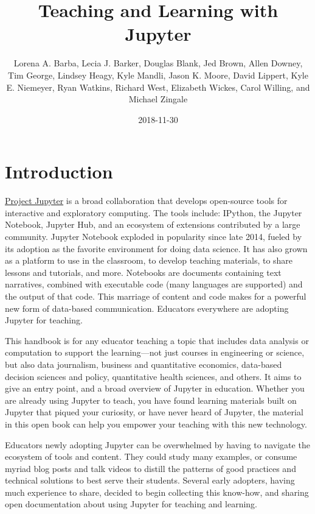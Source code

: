 \documentclass[]{book}
\title{Teaching and Learning with Jupyter}
\author{Lorena A. Barba, Lecia J. Barker, Douglas Blank, Jed Brown, Allen
Downey, Tim George, Lindsey Heagy, Kyle Mandli, Jason K. Moore, David
Lippert, Kyle E. Niemeyer, Ryan Watkins, Richard West, Elizabeth Wickes,
Carol Willing, and Michael Zingale}
\date{2018-11-30}
\begin{document}
\maketitle

{
\setcounter{tocdepth}{1}
\tableofcontents
}
\chapter{Introduction}\label{intro}

\href{http://jupyter.org/}{Project Jupyter} is a broad collaboration
that develops open-source tools for interactive and exploratory
computing. The tools include: IPython, the Jupyter Notebook, Jupyter
Hub, and an ecosystem of extensions contributed by a large community.
Jupyter Notebook exploded in popularity since late 2014, fueled by its
adoption as the favorite environment for doing data science. It has also
grown as a platform to use in the classroom, to develop teaching
materials, to share lessons and tutorials, and more. Notebooks are
documents containing text narratives, combined with executable code
(many languages are supported) and the output of that code. This
marriage of content and code makes for a powerful new form of data-based
communication. Educators everywhere are adopting Jupyter for teaching.

This handbook is for any educator teaching a topic that includes data
analysis or computation to support the learning---not just courses in
engineering or science, but also data journalism, business and
quantitative economics, data-based decision sciences and policy,
quantitative health sciences, and others. It aims to give an entry
point, and a broad overview of Jupyter in education. Whether you are
already using Jupyter to teach, you have found learning materials built
on Jupyter that piqued your curiosity, or have never heard of Jupyter,
the material in this open book can help you empower your teaching with
this new technology.

Educators newly adopting Jupyter can be overwhelmed by having to
navigate the ecosystem of tools and content. They could study many
examples, or consume myriad blog posts and talk videos to distill the
patterns of good practices and technical solutions to best serve their
students. Several early adopters, having much experience to share,
decided to begin collecting this know-how, and sharing open
documentation about using Jupyter for teaching and learning.
\end{document}
